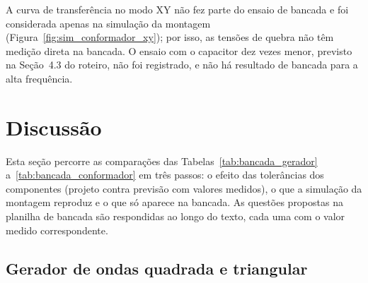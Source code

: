 \documentclass[11pt,a4paper]{article}
\begin{document}
A curva de transferência no modo XY não fez parte do ensaio de bancada e foi considerada apenas na simulação da montagem (Figura~\ref{fig:sim_conformador_xy}); por isso, as tensões de quebra não têm medição direta na bancada. O ensaio com o capacitor dez vezes menor, previsto na Seção~4.3 do roteiro, não foi registrado, e não há resultado de bancada para a alta frequência.

\section{Discussão}






Esta seção percorre as comparações das Tabelas~\ref{tab:bancada_gerador} a~\ref{tab:bancada_conformador} em três passos: o efeito das tolerâncias dos componentes (projeto contra previsão com valores medidos), o que a simulação da montagem reproduz e o que só aparece na bancada. As questões propostas na planilha de bancada são respondidas ao longo do texto, cada uma com o valor medido correspondente.

\subsection{Gerador de ondas quadrada e triangular}
\end{document}

